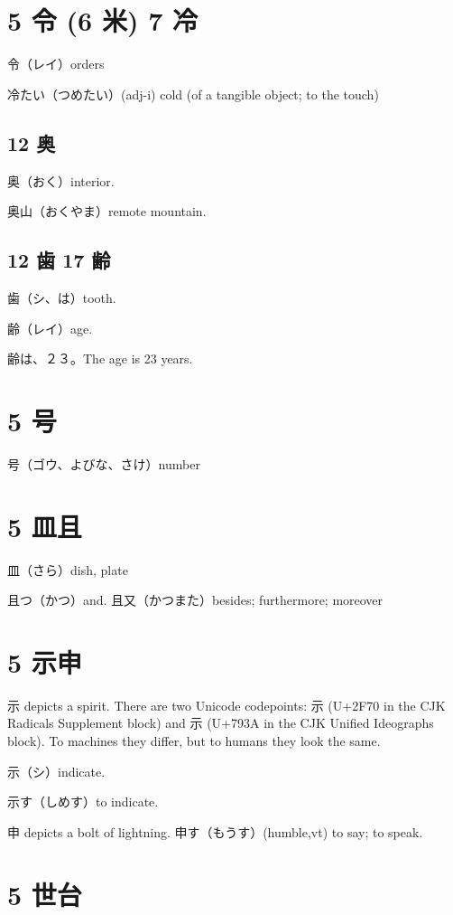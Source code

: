 \section{5 令 (6 米) 7 冷}

令（レイ）orders

冷たい（つめたい）(adj-i) cold (of a tangible object; to the touch)

\subsection{12 奥}

奥（おく）interior.

奥山（おくやま）remote mountain.

\subsection{12 歯 17 齢}

歯（シ、は）tooth.

齢（レイ）age.

齢は、２３。The age is 23 years.

\section{5 号}

号（ゴウ、よびな、さけ）number

\section{5 皿且}

皿（さら）dish, plate

且つ（かつ）and.
且又（かつまた）besides; furthermore; moreover

\section{5 示申}

示 depicts a spirit.
There are two Unicode codepoints:
⽰ (U+2F70 in the CJK Radicals Supplement block)
and 示 (U+793A in the CJK Unified Ideographs block).
To machines they differ,
but to humans they look the same.

示（シ）indicate.

示す（しめす）to indicate.

申 depicts a bolt of lightning.
申す（もうす）(humble,vt) to say; to speak.

\section{5 世台}

